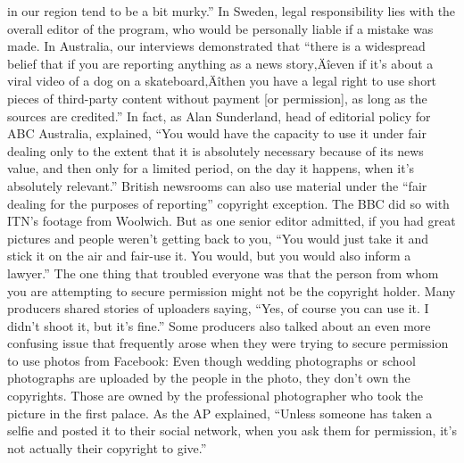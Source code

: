 \documentclass[symmetric, notoc, nobib]{towcenter-book}
\begin{document}
in our region tend to be a bit murky.'' In Sweden, legal responsibility lies
with the overall editor of the program, who would be personally liable if a
mistake was made.
In Australia, our interviews demonstrated that ``there is a widespread belief
that if you are reporting anything as a news story‚Äîeven if it's about a viral
video of a dog on a skateboard‚Äîthen you have a legal right to use short
pieces of third-party content without payment [or permission], as long as
the sources are credited.'' In fact, as Alan Sunderland, head of editorial policy
for ABC Australia, explained, ``You would have the capacity to use it
under fair dealing only to the extent that it is absolutely necessary because
of its news value, and then only for a limited period, on the day it happens,
when it's absolutely relevant.''
British newsrooms can also use material under the ``fair dealing for the purposes
of reporting'' copyright exception. The BBC did so with ITN's footage
from Woolwich. But as one senior editor admitted, if you had great pictures
and people weren't getting back to you, ``You would just take it and stick it
on the air and fair-use it. You would, but you would also inform a lawyer.''
The one thing that troubled everyone was that the person from whom you
are attempting to secure permission might not be the copyright holder.
Many producers shared stories of uploaders saying, ``Yes, of course you
can use it. I didn't shoot it, but it's fine.'' Some producers also talked about
an even more confusing issue that frequently arose when they were trying
to secure permission to use photos from Facebook: Even though wedding
photographs or school photographs are uploaded by the people in the
photo, they don't own the copyrights. Those are owned by the professional
photographer who took the picture in the first palace. As the AP explained,
``Unless someone has taken a selfie and posted it to their social network,
when you ask them for permission, it's not actually their copyright to give.''
\end{document}
